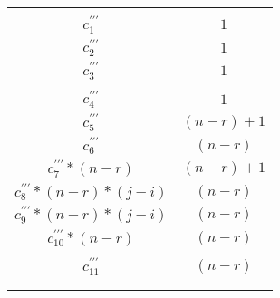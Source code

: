 \documentclass{article}
\begin{document}
    \begin{minipage}{0.70\textwidth}
        
    \end{minipage}
    \hfill
    \begin{minipage}{0.25\textwidth}
        \begin{tabular}{|c|c}
            $                        $                 &             \\
            $c^{\prime\prime\prime}_1$                 & $1$         \\
            $c^{\prime\prime\prime}_2$                 & $1$         \\
            $c^{\prime\prime\prime}_3$                 & $1$         \\
            $                        $                 &             \\
            $c^{\prime\prime\prime}_4$                 & $1$         \\
            $c^{\prime\prime\prime}_5$                 & $(n-r) + 1$ \\
            $c^{\prime\prime\prime}_6$                 & $(n-r)$     \\
            $c^{\prime\prime\prime}_7 * (n-r)$         & $(n-r) + 1$ \\
            $c^{\prime\prime\prime}_8 * (n-r) * (j-i)$ & $(n-r)$     \\
            $c^{\prime\prime\prime}_9 * (n-r) * (j-i)$ & $(n-r)$     \\
            $c^{\prime\prime\prime}_{10} * (n-r)$      & $(n-r)$     \\
            $                        $                 &             \\
            $c^{\prime\prime\prime}_{11}$              & $(n-r)$     \\
            $                        $                 &             \\
            $                        $                 &             \\
    \end{tabular}
    \end{minipage}
\end{document}
